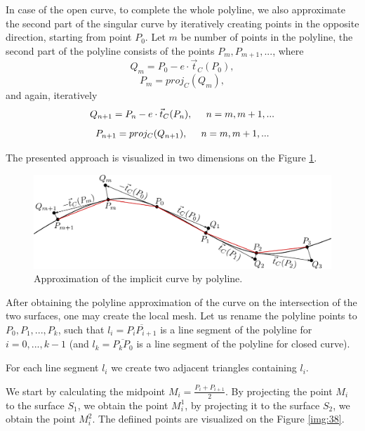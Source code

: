 In case of the open curve, to complete the whole polyline, we also approximate 
the second part of the singular curve by iteratively creating points in the 
opposite direction, starting from point $P_0$. Let $m$ be number of points
in the polyline, the second part of the polyline consists of the points
$P_m, P_{m+1}, ...$, where
$$Q_m = P_0 - e \cdot \vec{t}_C(P_0),$$
$$P_m = proj_C(Q_m),$$
and again, iteratively
$$Q_{n+1} = P_n - e \cdot \vec{t}_C(P_{n}), \hspace{5mm} n = m, m+1, ...$$
$$P_{n+1} = proj_C(Q_{n+1}), \hspace{5mm} n = m, m+1, ...$$

The presented approach is visualized in two dimensions on the Figure \ref{img:37}.

\begin{figure}
    \centerline{\includegraphics[scale=0.5]{images/img37}}
    \caption[Approximation of the implicit curve by polyline]
    {Approximation of the implicit curve by polyline.}
    \label{img:37}
\end{figure}

After obtaining the polyline approximation of the curve on the intersection
of the two surfaces, one may create the local mesh. Let us rename the polyline 
points to $P_0, P_1, ..., P_k$, such that $l_i = \overline{P_i P_{i+1}}$ is a 
line segment of the polyline for $i=0, ..., k-1$ (and $l_k = \overline{P_k P_0}$ is a 
line segment of the polyline for closed curve).

For each line segment $l_i$ we create two adjacent triangles containing $l_i$.

We start by calculating the midpoint $M_i = \frac{P_i+P_{i+1}}{2}$.
By projecting the point $M_i$ to the surface $S_1$, we obtain the point $M_i^1$,
by projecting it to the surface $S_2$, we obtain the point $M_i^2$. The defiined points
are visualized on the Figure \ref{img:38}.

